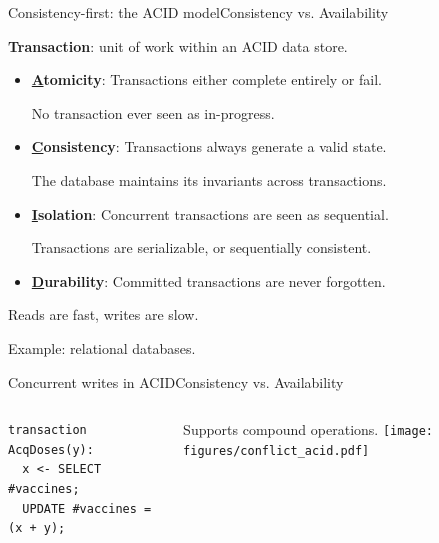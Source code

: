 \begin{frame}{Consistency-first: the ACID model}{Consistency vs. Availability}

\textbf{Transaction}: unit of work within an ACID data store. 
\vfill

\begin{itemize}
	\item \textbf{\underline{A}tomicity}: Transactions either complete entirely or fail.

	No transaction ever seen as in-progress.

	\item \textbf{\underline{C}onsistency}: Transactions always generate a valid state.

	The database maintains its invariants across transactions.

	\item \textbf{\underline{I}solation}: Concurrent transactions are seen as sequential.

	Transactions are serializable, or sequentially consistent.

	\item \textbf{\underline{D}urability}: Committed transactions are never forgotten.
\end{itemize}
\vfill\centering

Reads are fast, writes are slow.

\vfill\raggedright

Example: relational databases.
\end{frame}

\begin{frame}[fragile]{Concurrent writes in ACID}{Consistency vs. Availability}


\begin{columns}
	\begin{block}{}
		\begin{lstlisting}
transaction AcqDoses(y):
  x <- SELECT #vaccines;
  UPDATE #vaccines = (x + y);
		\end{lstlisting}
	\end{block}
	\vspace{5ex}

	Supports compound operations.
\centering
\texttt{[image: figures/conflict\_acid.pdf]}
\end{columns}

\end{frame}


